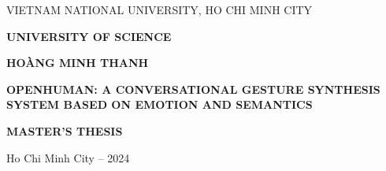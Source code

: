 \begin{titlepage}
	
	\begin{mdframed}[linewidth=1pt,
		linecolor=black,
		leftmargin=0,
		rightmargin=0,
		innertopmargin=20mm,
		innerbottommargin=20mm,
		innerleftmargin=10mm,
		innerrightmargin=10mm,
		skipabove=0,
		skipbelow=0]
		
		
		\centering
		\vspace*{1cm}
		
		{VIETNAM NATIONAL UNIVERSITY, HO CHI MINH CITY\par}
		\vspace{0.25cm}
		{\large \textbf{UNIVERSITY OF SCIENCE}\par}
		
		\vspace{2cm}
		
		{\large \MakeUppercase{\textbf{HOÀNG MINH THANH}}\par}
		
		\vspace{2cm}
		
		{\Large \bfseries
			\MakeUppercase{OpenHuman: A Conversational Gesture Synthesis System Based on Emotion and Semantics} \par}
		
		\vspace{3cm}
		
		{\large \bfseries
			MASTER'S THESIS\par}
		
		\vfill
		\vspace{3cm}
		
		{\small Ho Chi Minh City – 2024 \par}
	\end{mdframed}
\end{titlepage}

\pagebreak



